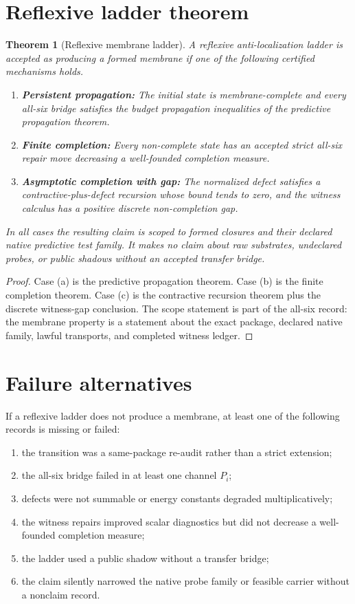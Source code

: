 \documentclass[11pt]{article}
\newtheorem{theorem}{Theorem}
\begin{document}
\section{Reflexive ladder theorem}
\begin{theorem}[Reflexive membrane ladder]
A reflexive anti-localization ladder is accepted as producing a formed membrane if one of the following certified mechanisms holds.
\begin{enumerate}[label=(\alph*)]
\item \textbf{Persistent propagation:} The initial state is membrane-complete and every all-six bridge satisfies the budget propagation inequalities of the predictive propagation theorem.
\item \textbf{Finite completion:} Every non-complete state has an accepted strict all-six repair move decreasing a well-founded completion measure.
\item \textbf{Asymptotic completion with gap:} The normalized defect satisfies a contractive-plus-defect recursion whose bound tends to zero, and the witness calculus has a positive discrete non-completion gap.
\end{enumerate}
In all cases the resulting claim is scoped to formed closures and their declared native predictive test family.  It makes no claim about raw substrates, undeclared probes, or public shadows without an accepted transfer bridge.
\end{theorem}

\begin{proof}
Case (a) is the predictive propagation theorem.  Case (b) is the finite completion theorem.  Case (c) is the contractive recursion theorem plus the discrete witness-gap conclusion.  The scope statement is part of the all-six record: the membrane property is a statement about the exact package, declared native family, lawful transports, and completed witness ledger.
\end{proof}

\section{Failure alternatives}
If a reflexive ladder does not produce a membrane, at least one of the following records is missing or failed:
\begin{enumerate}[label=(F\arabic*)]
\item the transition was a same-package re-audit rather than a strict extension;
\item the all-six bridge failed in at least one channel \(P_i\);
\item defects were not summable or energy constants degraded multiplicatively;
\item the witness repairs improved scalar diagnostics but did not decrease a well-founded completion measure;
\item the ladder used a public shadow without a transfer bridge;
\item the claim silently narrowed the native probe family or feasible carrier without a nonclaim record.
\end{enumerate}
\end{document}
